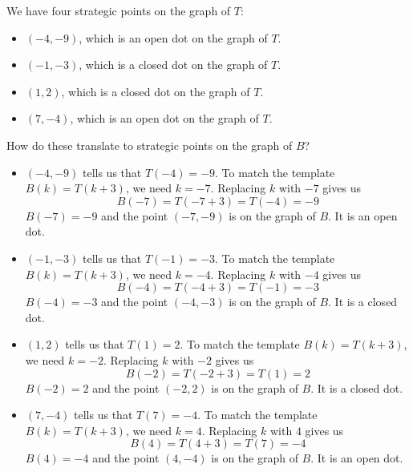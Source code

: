 \documentclass{ximera}
\begin{document}
We have four strategic points on the graph of $T$: 

\begin{itemize}

\item $(-4, -9)$, which is an open dot on the graph of $T$.
\item $(-1, -3)$, which is a closed dot on the graph of $T$.
\item $(1, 2)$, which is a closed dot on the graph of $T$.
\item $(7, -4)$, which is an open dot on the graph of $T$.

\end{itemize}


How do these translate to strategic points on the graph of $B$?


\begin{itemize}

\item $(-4, -9)$ tells us that $T(-4) = -9$.   
To match the template $B(k) = T(k+3)$, we need $k=-7$.  Replacing $k$ with $-7$ gives us
\[ B(-7) = T(-7 + 3) = T(-4) = -9\]
$B(-7) = -9$ and the point $(-7, -9)$ is on the graph of $B$. It is an open dot. \\


\item $(-1, -3)$ tells us that $T(-1) = -3$.   
To match the template $B(k) = T(k+3)$, we need $k=-4$.  Replacing $k$ with $-4$ gives us
\[ B(-4) = T(-4 + 3) = T(-1) = -3\]
$B(-4) = -3$ and the point $(-4, -3)$ is on the graph of $B$. It is a closed dot. \\


\item $(1, 2)$ tells us that $T(1) = 2$.   
To match the template $B(k) = T(k+3)$, we need $k=-2$.  Replacing $k$ with $-2$ gives us
\[ B(-2) = T(-2 + 3) = T(1) = 2\]
$B(-2) = 2$ and the point $(-2, 2)$ is on the graph of $B$. It is a closed dot. \\


\item $(7, -4)$ tells us that $T(7) = -4$.   
To match the template $B(k) = T(k+3)$, we need $k=4$.  Replacing $k$ with $4$ gives us
\[ B(4) = T(4 + 3) = T(7) = -4\]
$B(4) = -4$ and the point $(4, -4)$ is on the graph of $B$. It is an open dot.


\end{itemize}
\end{document}
